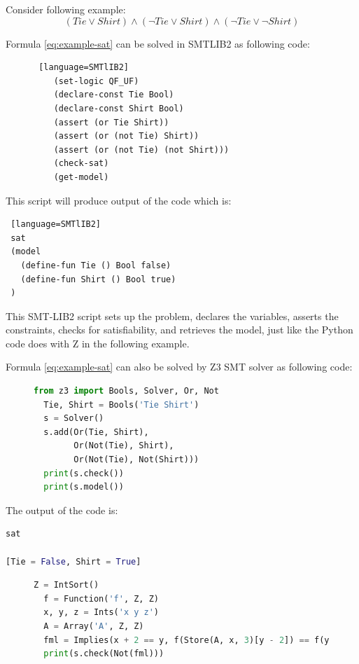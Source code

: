 \documentclass[]{rptuseminar}
\begin{document}
Consider following example:
\begin{equation}
  \label{eq:example-sat}
  (Tie \lor Shirt) \land (\lnot Tie \lor Shirt) \land (\lnot Tie \lor \lnot Shirt)
\end{equation}

Formula \ref{eq:example-sat} can be solved in SMTLIB2 as following code:

\begin{figure}[ht]
  \begin{lstlisting} [language=SMTlIB2]
    (set-logic QF_UF)
    (declare-const Tie Bool)
    (declare-const Shirt Bool)
    (assert (or Tie Shirt))
    (assert (or (not Tie) Shirt))
    (assert (or (not Tie) (not Shirt)))
    (check-sat)
    (get-model)
  \end{lstlisting}
  \end{figure}

  This script will produce output of the code which is:


\begin{lstlisting} [language=SMTlIB2]
 sat
 (model
   (define-fun Tie () Bool false)
   (define-fun Shirt () Bool true)
 )
\end{lstlisting}
\vspace{1em}

This SMT-LIB2 script sets up the problem, declares the variables, asserts the constraints, checks for satisfiability,
  and retrieves the model, just like the Python code does with Z in the following example.

  Formula \ref{eq:example-sat} can also be solved by Z3 SMT solver as following code:

\begin{figure}[ht]
\begin{lstlisting}[language=Python]
  from z3 import Bools, Solver, Or, Not
  Tie, Shirt = Bools('Tie Shirt')
  s = Solver()
  s.add(Or(Tie, Shirt),
        Or(Not(Tie), Shirt),
        Or(Not(Tie), Not(Shirt)))
  print(s.check())
  print(s.model())
\end{lstlisting}
\end{figure}
The output of the code is:


\begin{lstlisting}[language=Python]
sat

[Tie = False, Shirt = True]
\end{lstlisting}

\begin{figure}[ht]
\begin{lstlisting}[language=Python]
  Z = IntSort()
  f = Function('f', Z, Z)
  x, y, z = Ints('x y z')
  A = Array('A', Z, Z)
  fml = Implies(x + 2 == y, f(Store(A, x, 3)[y - 2]) == f(y - x + 1))
  print(s.check(Not(fml)))
\end{lstlisting}
\end{figure}
\end{document}
